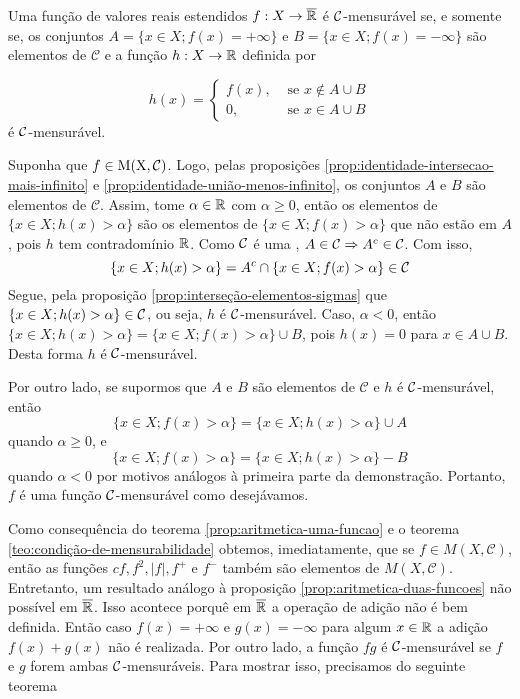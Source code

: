     \begin{theorem}
    \label{teo:condição-de-mensurabilidade}
        Uma função de valores reais estendidos $f: X \to \operatorname{\overline{\mathbb{R}}}$ é $\operatorname{\mathcal{C}}$-mensurável se, e somente se, os conjuntos 
        $A = \{ x \in X; f(x) = +\infty\}$ e $B = \{x \in X; f(x) = -\infty\}$
		 são elementos de $\mathcal{C}$ e a função $h: X \to \mathbb{R}$ definida por
		 
		 $$
		 h(x) = \left\{\begin{array}{cc}
		     f(x), & \textrm{\ se } x \notin A\cup B  \\
		      0,& \textrm{\ se } x \in A\cup B
		 \end{array}\right.
		 $$
		 é $\operatorname{\mathcal{C}}$-mensurável.
	 \end{theorem}
\begin{prova}
    Suponha que $f \in \operatorname{M(X, \mathcal{C} )}$. 
    Logo, pelas proposições \ref{prop:identidade-intersecao-mais-infinito} e \ref{prop:identidade-união-menos-infinito}, os conjuntos $A$ e $B$ são elementos de $\mathcal{C}$.
    Assim, tome $\alpha \in \mathbb{R}$ com $\alpha \geq 0$, então os elementos de $\{x \in X; h(x) > \alpha\}$ são os elementos de $\{x \in X; f(x) > \alpha\}$ que não estão em $A$, pois $h$ tem contradomínio $\mathbb{R}$.
    Como $\operatorname{\mathcal{C}}$ é uma \sigal, $A \in \operatorname{\mathcal{C}} \Rightarrow A^c \in \operatorname{\mathcal{C}}$. 
    Com isso, 
    $$
    \{x \in X; h(x) > \alpha\} = A^c\cap \{x \in X; f(x) > \alpha\} \in \operatorname{\mathcal{C}}
    $$
    Segue, pela proposição \ref{prop:interseção-elementos-sigmas} que $\{x \in X; h(x) > \alpha\} \in \operatorname{\mathcal{C}}$, ou seja, $h$ é $\operatorname{\mathcal{C}}$-mensurável.
    Caso, $\alpha < 0$, então $\{x \in X; h(x) > \alpha\} = \{x \in  X ; f(x) > \alpha\} \cup B $, pois $h(x) = 0$ para $x \in A \cup B$.
    Desta forma $h$ é $\operatorname{\mathcal{C}}$-mensurável.

    Por outro lado, se supormos que $A$ e $B$ são elementos de $\mathcal{C}$ e $h$ é $\operatorname{\mathcal{C}}$-mensurável, então
    $$\{x \in X; f(x) > \alpha\} = \{x \in  X ; h(x) > \alpha\} \cup A $$
    quando $\alpha \geq 0$, e 
    $$\{x \in X; f(x) > \alpha\} = \{x \in  X ; h(x) > \alpha\} - B $$
    quando  $\alpha < 0$ por motivos análogos à primeira parte da demonstração.
    Portanto, $f$ é uma função $\operatorname{\mathcal{C}}$-mensurável como desejávamos.
\end{prova}

Como consequência do teorema \ref{prop:aritmetica-uma-funcao} e o teorema \ref{teo:condição-de-mensurabilidade} obtemos, imediatamente, que se $ f \in M(X,\mathcal{C})$, então as funções $cf, f^2, |f|, f^+$ e $f^-$ também são elementos de $M(X, \mathcal{C})$.
Entretanto, um resultado análogo à proposição \ref{prop:aritmetica-duas-funcoes} não possível em $\operatorname{\overline{\mathbb{R}}}$.
Isso acontece porquê em $\operatorname{\overline{\mathbb{R}}}$ a operação de adição não é bem definida.
Então caso $f(x) = +\infty$ e $g(x) = -\infty$ para algum $x \in \mathbb{R}$ a adição
$f(x) + g(x)$ não é realizada.
Por outro lado, a função $fg$ é $\operatorname{\mathcal{C}}$-mensurável se $f$ e $g$ forem ambas $\operatorname{\mathcal{C}}$-mensuráveis.
Para mostrar isso, precisamos do seguinte teorema

